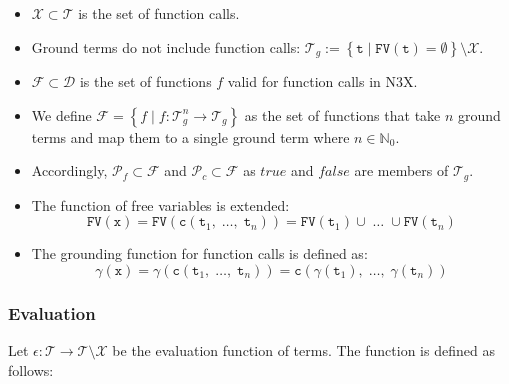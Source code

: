\documentclass[runningheads]{llncs}
\begin{document}
\begin{itemize}
  \item $\mathcal{X} \subset \mathcal{T}$ is the set of function calls.
  \item Ground terms do not include function calls: $\mathcal{T}_g := \left\{\texttt{t} \mid \texttt{FV}(\texttt{t}) = \emptyset\right\} \setminus \mathcal{X}$.
  \item $\mathcal{F} \subset \mathcal{D}$ is the set of functions $f$ valid for function calls in N3X.
  \item We define $\mathcal{F} = \left\{f \mid f: \mathcal{T}_g^n \rightarrow \mathcal{T}_g\right\}$ as the set of functions that take $n$ ground terms and map them to a single ground term where $n \in \mathbb{N}_0$.
  \item Accordingly, $\mathcal{P}_f \subset \mathcal{F}$ and $\mathcal{P}_c \subset \mathcal{F}$ as $true$ and $false$ are members of $\mathcal{T}_g$.
  \item The function of free variables is extended:
    \begin{equation*}
      \texttt{FV}(\texttt{x}) = \texttt{FV}(\texttt{c}(\texttt{t}_1,\;\dots,\; \texttt{t}_n)) = \texttt{FV}(\texttt{t}_1) \cup \;\dots\; \cup \texttt{FV}(\texttt{t}_n)
    \end{equation*}
  \item The grounding function for function calls is defined as:
    \begin{equation*}
      \gamma(\texttt{x}) = \gamma(\texttt{c}(\texttt{t}_1,\;\dots,\; \texttt{t}_n)) = \texttt{c}(\gamma(\texttt{t}_1),\;\dots,\; \gamma(\texttt{t}_n))
    \end{equation*}
\end{itemize}



\subsubsection{Evaluation}
\label{sec:n3x-semantics-eval}

Let $\epsilon: \mathcal{T} \rightarrow \mathcal{T} \setminus \mathcal{X}$ be the evaluation function of terms.
The function is defined as follows:
\end{document}
